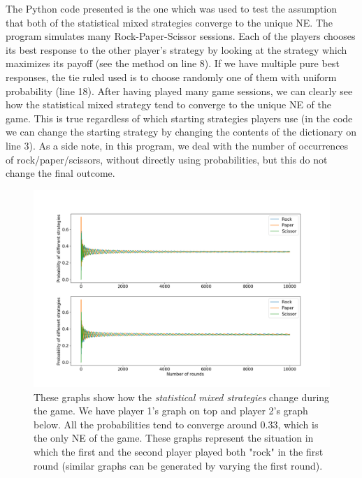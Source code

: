 \documentclass[11pt,a4paper]{article}
\begin{document}
The Python code presented is the one which was used to test the assumption that both of the
statistical mixed strategies converge to the unique NE. The program simulates many Rock-Paper-Scissor
sessions. Each of the players chooses its best response to the other player’s strategy by looking at the
strategy which maximizes its payoff (see the method on line 8). If we have multiple pure best responses,
the tie ruled used is to choose randomly one of them with uniform probability (line 18). After having
played many game sessions, we can clearly see how the statistical mixed strategy tend to converge to
the unique NE of the game. This is true regardless of which starting strategies players use (in the
code we can change the starting strategy by changing the contents of the dictionary on line 3). As a side note, in this program, we deal with the number of occurrences of rock/paper/scissors, without directly using probabilities, but this do not change the final outcome.
\begin{figure}[b!]
\centering
\includegraphics[width=\textwidth]{../100_100.png}
\caption{These graphs show how the \textit{statistical mixed strategies} change during the game.
We have player 1's graph on top and player 2's graph below. All the probabilities tend to converge
around 0.33, which is the only NE of the game. These graphs represent the situation in which the
first and the second player played both "rock" in the first round (similar graphs can be generated
by varying the first round).}
\end{figure}
\end{document}
